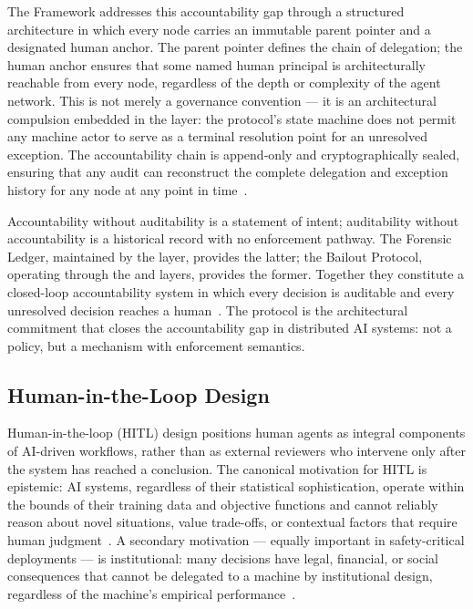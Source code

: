 The \bxthree{} Framework addresses this accountability gap through a structured architecture in which every node carries an immutable parent pointer and a designated human anchor. The parent pointer defines the chain of delegation; the human anchor ensures that some named human principal is architecturally reachable from every node, regardless of the depth or complexity of the agent network. This is not merely a governance convention — it is an architectural compulsion embedded in the \bounds{} layer: the protocol's state machine does not permit any machine actor to serve as a terminal resolution point for an unresolved exception. The accountability chain is append-only and cryptographically sealed, ensuring that any audit can reconstruct the complete delegation and exception history for any node at any point in time~\cite{wiener1948}.

Accountability without auditability is a statement of intent; auditability without accountability is a historical record with no enforcement pathway. The \bxthree{} Forensic Ledger, maintained by the \fact{} layer, provides the latter; the Bailout Protocol, operating through the \purpose{} and \bounds{} layers, provides the former. Together they constitute a closed-loop accountability system in which every decision is auditable and every unresolved decision reaches a human~\cite{bansal2019}. The protocol is the architectural commitment that closes the accountability gap in distributed AI systems: not a policy, but a mechanism with enforcement semantics.

\subsection{Human-in-the-Loop Design}
\label{sec:hitl}

Human-in-the-loop (HITL) design positions human agents as integral components of AI-driven workflows, rather than as external reviewers who intervene only after the system has reached a conclusion. The canonical motivation for HITL is epistemic: AI systems, regardless of their statistical sophistication, operate within the bounds of their training data and objective functions and cannot reliably reason about novel situations, value trade-offs, or contextual factors that require human judgment~\cite{tristr81}. A secondary motivation — equally important in safety-critical deployments — is institutional: many decisions have legal, financial, or social consequences that cannot be delegated to a machine by institutional design, regardless of the machine's empirical performance~\cite{bansal2019}.

